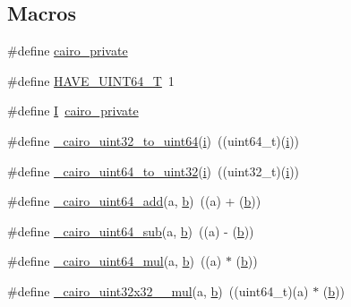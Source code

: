 \subsection*{Macros}
\begin{DoxyCompactItemize}
\item 
\#define \hyperlink{cairo-wideint-private_8h_a20eac7788868acdd7a4f0e6289fc4a72}{cairo\+\_\+private}
\item 
\#define \hyperlink{cairo-wideint-private_8h_a7182a632cd1d349a7300635865886059}{H\+A\+V\+E\+\_\+\+U\+I\+N\+T64\+\_\+T}~1
\item 
\#define \hyperlink{cairo-wideint-private_8h_a60ef6e1bcfabb95cfeb300e1d03ce470}{I}~\hyperlink{cairo-wideint-private_8h_a20eac7788868acdd7a4f0e6289fc4a72}{cairo\+\_\+private}
\item 
\#define \hyperlink{cairo-wideint-private_8h_ae6926b42ba8d416207a6327091462d3d}{\+\_\+cairo\+\_\+uint32\+\_\+to\+\_\+uint64}(\hyperlink{lte__uplink__power__control_8m_a6f6ccfcf58b31cb6412107d9d5281426}{i})~((uint64\+\_\+t)(\hyperlink{lte__uplink__power__control_8m_a6f6ccfcf58b31cb6412107d9d5281426}{i}))
\item 
\#define \hyperlink{cairo-wideint-private_8h_a061bc60ff1861b1bc47c7e344f5557dd}{\+\_\+cairo\+\_\+uint64\+\_\+to\+\_\+uint32}(\hyperlink{lte__uplink__power__control_8m_a6f6ccfcf58b31cb6412107d9d5281426}{i})~((uint32\+\_\+t)(\hyperlink{lte__uplink__power__control_8m_a6f6ccfcf58b31cb6412107d9d5281426}{i}))
\item 
\#define \hyperlink{cairo-wideint-private_8h_a233d42c3678deb29983fdead5483b03d}{\+\_\+cairo\+\_\+uint64\+\_\+add}(a,  \hyperlink{lte__pathloss_8m_a21ad0bd836b90d08f4cf640b4c298e7c}{b})~((a) + (\hyperlink{lte__pathloss_8m_a21ad0bd836b90d08f4cf640b4c298e7c}{b}))
\item 
\#define \hyperlink{cairo-wideint-private_8h_a886253cbf8a04593b046e35bcf51c45c}{\+\_\+cairo\+\_\+uint64\+\_\+sub}(a,  \hyperlink{lte__pathloss_8m_a21ad0bd836b90d08f4cf640b4c298e7c}{b})~((a) -\/ (\hyperlink{lte__pathloss_8m_a21ad0bd836b90d08f4cf640b4c298e7c}{b}))
\item 
\#define \hyperlink{cairo-wideint-private_8h_a4944253efd63a9a22b3678753463c66d}{\+\_\+cairo\+\_\+uint64\+\_\+mul}(a,  \hyperlink{lte__pathloss_8m_a21ad0bd836b90d08f4cf640b4c298e7c}{b})~((a) $\ast$ (\hyperlink{lte__pathloss_8m_a21ad0bd836b90d08f4cf640b4c298e7c}{b}))
\item 
\#define \hyperlink{cairo-wideint-private_8h_a575f3101382f6223038c6d9f457a37be}{\+\_\+cairo\+\_\+uint32x32\+\_\+\_\+mul}(a,  \hyperlink{lte__pathloss_8m_a21ad0bd836b90d08f4cf640b4c298e7c}{b})~((uint64\+\_\+t)(a) $\ast$ (\hyperlink{lte__pathloss_8m_a21ad0bd836b90d08f4cf640b4c298e7c}{b}))

\end{DoxyCompactItemize}
